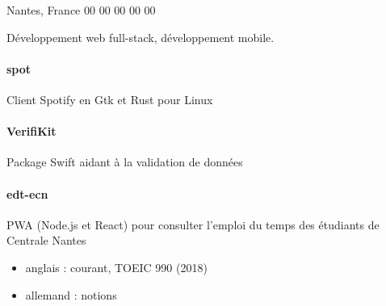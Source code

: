 \documentclass{cv}
\begin{document}
\begin{minipage}[t]{0.28\textwidth}%


	 Nantes, France
	\newline{} 00 00 00 00 00%
	\newline{} \href{mailto:%
	}{}%
	\newline{} \href{https://github.com/xou816}{} 


	Développement web full-stack, développement mobile.

	\begin{center}
	  
	  
	  
	  
	  
	\end{center}

	\raggedright
	\paragraph{ spot} Client Spotify en Gtk et Rust pour Linux
	\paragraph{ VerifiKit} Package Swift aidant à la validation de données
	\paragraph{ edt-ecn} PWA (Node.js et React) pour consulter l'emploi du temps des étudiants de Centrale Nantes


	\begin{itemize}
	\item anglais : courant, TOEIC 990 (2018)
	\item allemand : notions
	\end{itemize}
		
\end{minipage}



\end{document}
